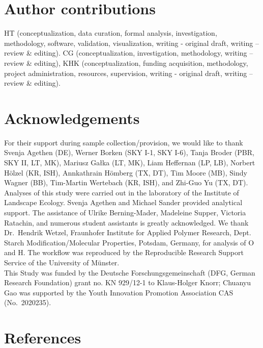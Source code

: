 \documentclass[alpha-refs]{wiley-article-rmd}
\begin{document}
\begin{refsection}
{\section*{Author contributions}\label{author-contributions}}

HT (conceptualization, data curation, formal analysis, investigation, methodology, software, validation, visualization, writing - original draft, writing -- review \& editing). CG (conceptualization, investigation, methodology, writing -- review \& editing), KHK (conceptualization, funding acquisition, methodology, project administration, resources, supervision, writing - original draft, writing -- review \& editing).

\hypertarget{acknowledgements}{%
\section*{Acknowledgements}\label{acknowledgements}}

For their support during sample collection/provision, we would like to thank Svenja Agethen (DE), Werner Borken (SKY I-1, SKY I-6), Tanja Broder (PBR, SKY II, LT, MK), Mariusz Gałka (LT, MK), Liam Heffernan (LP, LB), Norbert Hölzel (KR, ISH), Annkathrain Hömberg (TX, DT), Tim Moore (MB), Sindy Wagner (BB), Tim-Martin Wertebach (KR, ISH), and Zhi-Guo Yu (TX, DT).\\
Analyses of this study were carried out in the laboratory of the Institute of Landscape Ecology. Svenja Agethen and Michael Sander provided analytical support. The assistance of Ulrike Berning-Mader, Madeleine Supper, Victoria Ratachin, and numerous student assistants is greatly acknowledged. We thank Dr.~Hendrik Wetzel, Fraunhofer Institute for Applied Polymer Research, Dept. Starch Modification/Molecular Properties, Potsdam, Germany, for analysis of O and H. The workflow was reproduced by the Reproducible Research Support Service of the University of Münster.\\
This Study was funded by the Deutsche Forschungsgemeinschaft (DFG, German Research Foundation) grant no. KN 929/12-1 to Klaus-Holger Knorr; Chuanyu Gao was supported by the Youth Innovation Promotion Association CAS (No.~2020235).

\hypertarget{references}{%
\section*{References}\label{references}}

\printbibliography[heading=none]

\end{refsection}
\end{document}
